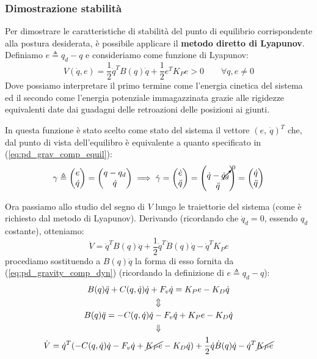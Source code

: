\vspace*{20pt}
\subsubsection{Dimostrazione stabilità}
\boldmath
Per dimostrare le caratteristiche di stabilità del punto di equilibrio corrispondente alla postura desiderata, è possibile applicare il \textbf{metodo diretto di Lyapunov}. Definiamo $e \triangleq q_d - q$ e consideriamo come funzione di Lyapunov:
$$
V(\dot{q}, e) = \frac{1}{2}\dot{q}^TB(q)\dot{q} + \frac{1}{2}e^TK_Pe > 0    \qquad \forall q,e\neq0
$$
Dove possiamo interpretare il primo termine come l’energia cinetica del sistema ed il secondo come l’energia potenziale immagazzinata grazie alle rigidezze equivalenti date dai guadagni delle retroazioni delle posizioni ai giunti.

In questa funzione è stato scelto come stato del sistema il vettore $(e, \ \dot{q})^T$ che, dal punto di vista dell'equilibro è equivalente a quanto specificato in (\ref{eq:pd_grav_comp_equil}):
\begin{gather*}
\gamma \triangleq \begin{pmatrix}e \\ \dot{q}\end{pmatrix} = \begin{pmatrix}q - q_d \\ \dot{q}\end{pmatrix}
\implies 
\dot{\gamma} = \begin{pmatrix}\dot{e} \\ \ddot{q}\end{pmatrix} = \begin{pmatrix}\dot{q} - \cancelto{0}{\dot{q}_d} \\ \ddot{q}\end{pmatrix} = \begin{pmatrix}\dot{q} \\ \ddot{q}\end{pmatrix}
\end{gather*}


Ora passiamo allo studio del segno di $V$ lungo le traiettorie del sistema (come è richiesto dal metodo di Lyapunov). Derivando (ricordando che $\dot{q}_d = 0$, essendo $q_d$ costante), otteniamo:
$$
\dot{V} = \dot{q}^TB(q)\ddot{q} + \frac{1}{2}\dot{q}^T\dot{B}(q)\dot{q} - \dot{q}^TK_Pe
$$
procediamo sostituendo a $B(q)\ddot{q}$ la forma di esso fornita da (\ref{eq:pd_gravity_comp_dyn}) (ricordando la definizione di $e \triangleq q_d - q$):
\begin{gather*}
	B(q)\ddot{q} + C(q, \dot{q})\dot{q} + F_v\dot{q} = K_Pe - K_D\dot{q} \\
	\Updownarrow \\
	B(q)\ddot{q} = -C(q, \dot{q})\dot{q} - F_v\dot{q} + K_Pe - K_D\dot{q} \\
	\Downarrow \\
	\dot{V} = \dot{q}^T( -C(q, \dot{q})\dot{q} - F_v\dot{q} + \cancel{K_Pe} - K_D\dot{q} ) + \frac{1}{2}\dot{q}\dot{B}(q)\dot{q} - \dot{q}^T \cancel{K_Pe}
\end{gather*}


